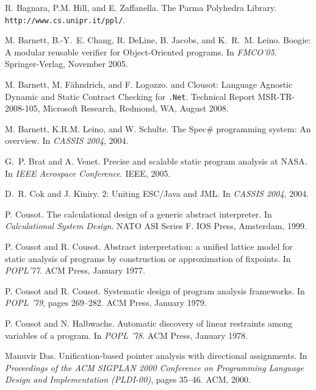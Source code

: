 \documentclass[10pt]{sigplanconf}
\begin{document}

%
\begin{thebibliography}{10}

R{.} Bagnara, P{.}M{.} Hill, and E{.} Zaffanella.
\newblock The {P}arma {P}olyhedra {L}ibrary.
\newblock \texttt{http://www.cs.unipr.it/ppl/}.

M{.} Barnett, B{.}-Y{.}~E{.} Chang, R{.} DeLine, B{.} Jacobs, and K.~R{.}~M.
  Leino.
\newblock Boogie: A modular reusable verifier for {O}bject-{O}riented programs.
\newblock In {\em FMCO'05}. Springer-Verlag, November 2005.

M{.} Barnett, M{.} F\"ahndrich, and F{.} Logozzo.
 and {Clousot}: {L}anguage {A}gnostic {D}ynamic and {S}tatic
  {C}ontract {C}hecking for \texttt{.Net}.
\newblock Technical Report MSR-TR-2008-105, Microsoft Research, Redmond, WA,
  August 2008.

M{.} Barnett, K{.}R{.}M{.} Leino, and W{.} Schulte.
\newblock The {S}pec\# programming system: An overview.
\newblock In {\em CASSIS 2004}, 2004.

G{.}~P{.} Brat and A{.} Venet.
\newblock Precise and scalable static program analysis at {NASA}.
\newblock In {\em IEEE Aerospace Conference}. IEEE, 2005.

D{.}~R{.} Cok and J{.} Kiniry.
 2: Uniting {ESC/Java} and {JML}.
\newblock In {\em CASSIS 2004}, 2004.

P{.} Cousot.
\newblock The calculational design of a generic abstract interpreter.
\newblock In {\em Calculational System Design}. NATO ASI Series F. IOS Press,
  Amsterdam, 1999.

P{.} Cousot and R{.} Cousot.
\newblock Abstract interpretation: a unified lattice model for static analysis
  of programs by construction or approximation of fixpoints.
\newblock In {\em POPL'77}. ACM Press, January 1977.

P{.} Cousot and R{.} Cousot.
\newblock Systematic design of program analysis frameworks.
\newblock In {\em POPL '79}, pages 269--282. ACM Press, January 1979.

P{.} Cousot and N{.} Halbwachs.
\newblock Automatic discovery of linear restraints among variables of a
  program.
\newblock In {\em POPL '78}. ACM Press, January 1978.

Manuvir Das.
\newblock Unification-based pointer analysis with directional assignments.
\newblock In {\em Proceedings of the {ACM} {SIGPLAN} 2000 Conference on
  Programming Language Design and Implementation ({PLDI}-00)}, pages 35--46.
  ACM, 2000.


\end{thebibliography}
\end{document}
